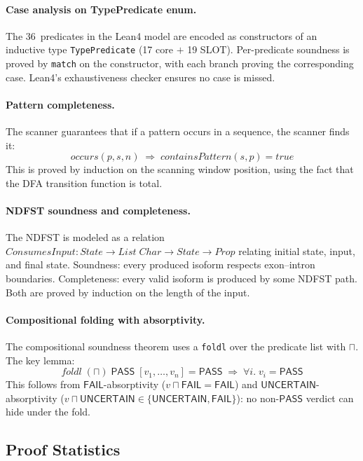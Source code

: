 \documentclass[acmsmall,review,anonymous]{acmart}
\newcommand{\PASS}{\ensuremath{\mathsf{PASS}}\xspace}
\newcommand{\FAIL}{\ensuremath{\mathsf{FAIL}}\xspace}
\newcommand{\UNCERTAIN}{\ensuremath{\mathsf{UNCERTAIN}}\xspace}
\newcommand{\tand}{\sqcap}
\begin{document}
\paragraph{Case analysis on TypePredicate enum.}
The 36~predicates in the Lean4 model are encoded as constructors of an inductive type
\texttt{TypePredicate} (17 core $+$ 19 SLOT).
Per-predicate soundness is proved by \texttt{match} on the constructor,
with each branch proving the corresponding case.
Lean4's exhaustiveness checker ensures no case is missed.

\paragraph{Pattern completeness.}
The scanner guarantees that if a pattern occurs in a sequence, the
scanner finds it:
\[
  \mathit{occurs}(p, s, n) \;\Rightarrow\;
  \mathit{containsPattern}(s, p) = \mathit{true}
\]
This is proved by induction on the scanning window position,
using the fact that the DFA transition function is total.

\paragraph{NDFST soundness and completeness.}
The NDFST is modeled as a relation
$\mathit{ConsumesInput} : \mathit{State} \to \mathit{List}\;\mathit{Char}
 \to \mathit{State} \to \mathit{Prop}$
relating initial state, input, and final state.
Soundness: every produced isoform respects exon--intron boundaries.
Completeness: every valid isoform is produced by some NDFST path.
Both are proved by induction on the length of the input.

\paragraph{Compositional folding with absorptivity.}
The compositional soundness theorem uses a \texttt{foldl} over the
predicate list with $\tand$.
The key lemma:
\[
  \mathit{foldl}\;(\tand)\;\PASS\;[v_1, \ldots, v_n] = \PASS
  \;\Longrightarrow\;
  \forall i.\; v_i = \PASS
\]
This follows from \FAIL-absorptivity ($v \tand \FAIL = \FAIL$) and
\UNCERTAIN-absorptivity ($v \tand \UNCERTAIN \in \{\UNCERTAIN, \FAIL\}$):
no non-\PASS{} verdict can hide under the fold.

\subsection{Proof Statistics}\label{sec:proof-stats}
\end{document}
